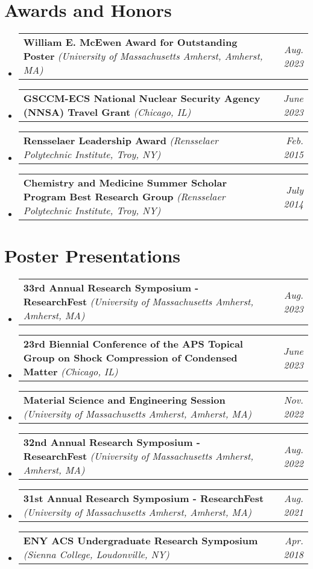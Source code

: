 \documentclass[letterpaper,11pt]{article}
\makeatletter
\newcommand{\award}[3]{
    \vspace{-2pt}
    \scriptsize
    \item[]
    \begin{tabularx}{\textwidth}{l@{\extracolsep{\fill}}r}
        \textbf{#1} \textit{(#2)} & \textit{#3} \\
    \end{tabularx}\vspace{-12pt}
}
\newcommand{\presentation}[3]{
    \vspace{-2pt}
    \scriptsize
    \item[]
    \begin{tabularx}{\textwidth}{l@{\extracolsep{\fill}}r}
        \textbf{#1} \textit{(#2)} & \textit{#3} \\
    \end{tabularx}\vspace{-12pt}
}
\makeatother
\begin{document}
\section{Awards and Honors}
    \vspace{4pt}
    \begin{itemize}[leftmargin=0pt]
        \award{William E. McEwen Award for Outstanding Poster}{University of Massachusetts Amherst, Amherst, MA}{Aug. 2023}
        \award{GSCCM-ECS National Nuclear Security Agency (NNSA) Travel Grant}{Chicago, IL}{June 2023}
        \award{Rensselaer Leadership Award}{Rensselaer Polytechnic Institute, Troy, NY}{Feb. 2015}
        \award{Chemistry and Medicine Summer Scholar Program Best Research Group}{Rensselaer Polytechnic Institute, Troy, NY}{July 2014}
    \end{itemize}


\section{Poster Presentations}
    \vspace{4pt}
    \begin{itemize}[leftmargin=0pt]
        \presentation{33rd Annual Research Symposium - ResearchFest}{University of Massachusetts Amherst, Amherst, MA}{Aug. 2023}
        \presentation{23rd Biennial Conference of the APS Topical Group on Shock Compression of Condensed Matter}{Chicago, IL}{June 2023}
        \presentation{Material Science and Engineering Session}{University of Massachusetts Amherst, Amherst, MA}{Nov. 2022}
        \presentation{32nd Annual Research Symposium - ResearchFest}{University of Massachusetts Amherst, Amherst, MA}{Aug. 2022}
        \presentation{31st Annual Research Symposium - ResearchFest}{University of Massachusetts Amherst, Amherst, MA}{Aug. 2021}
        \presentation{ENY ACS Undergraduate Research Symposium}{Sienna College, Loudonville, NY}{Apr. 2018}
    \end{itemize}
    
    
\end{document}
